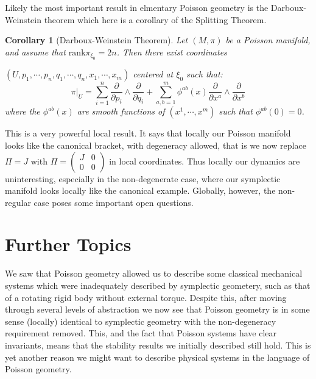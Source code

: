 \documentclass[psamsfonts,12pt]{amsart}
\newcommand\0{\mathbf{0}}
\theoremstyle{plain}
\newtheorem{cor}[thm]{Corollary}
\theoremstyle{definition}
\begin{document}
Likely the most important result in elmentary Poisson geometry is the Darboux-Weinstein theorem which here is a corollary of the Splitting Theorem.

\begin{cor}[Darboux-Weinstein Theorem]
Let $(M,\pi)$ be a Poisson manifold, and assume that $\mathrm{rank}\pi_{\xi_0}=2n$.  Then there exist coordinates

$(U,p_1,\cdots, p_n,q_1,\cdots, q_n,x_1,\cdots, x_m)$ centered at $\xi_0$ such that:
\[
\pi|_U = \sum_{i=1}^{n}\frac{\partial}{\partial p_i}\wedge \frac{\partial}{\partial q_i}+\sum_{a,b=1}^{m}\phi^{ab}(x)\frac{\partial}{\partial x^a}\wedge \frac{\partial}{\partial x^b}
\]
where the $\phi^{ab}(x)$ are smooth functions of $(x^1,\cdots, x^m)$ such that $\phi^{ab}(0)=0$.
\end{cor}

This is a very powerful local result.  It says that locally our Poisson manifold looks like the canonical bracket, with degeneracy allowed, that is we now replace $\Pi=J$ with $\Pi=\begin{pmatrix} J& 0\\ 0& 0\end{pmatrix}$ in local coordinates.  Thus locally our dynamics are uninteresting, especially in the non-degenerate case, where our symplectic manifold looks locally like the canonical example.  Globally, however, the non-regular case poses some important open questions.


\section{Further Topics}

We saw that Poisson geometry allowed us to describe some classical mechanical systems which were inadequately described by symplectic geometery, such as that of a rotating rigid body without external torque.  Despite this, after moving through several levels of abstraction we now see that Poisson geometry is in some sense (locally) identical to symplectic geometry with the non-degeneracy requirement removed.  This, and the fact that Poisson systems have clear invariants, means that the stability results we initially described still hold.  This is yet another reason we might want to describe physical systems in the language of Poisson geometry.
\end{document}
